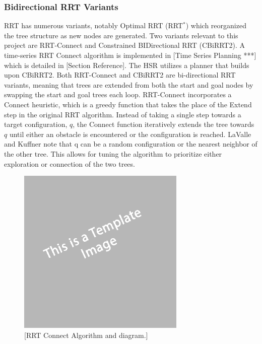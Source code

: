 \documentclass[12pt]{article}
\begin{document}
        \subsubsection{Bidirectional RRT Variants}
            RRT has numerous variants, notably Optimal RRT (RRT\(^*\)) which reorganized the tree structure as new nodes are generated. Two variants relevant to this project are RRT-Connect and Constrained BIDirectional RRT (CBiRRT2). A time-series RRT Connect algorithm is implemented in [Time Series Planning ***] which is detailed in [Section Reference]. The HSR utilizes a planner that builds upon CBiRRT2. Both RRT-Connect and CBiRRT2 are bi-directional RRT variants, meaning that trees are extended from both the start and goal nodes by swapping the start and goal trees each loop. RRT-Connect incorporates a Connect heuristic, which is a greedy function that takes the place of the Extend step in the original RRT algorithm. Instead of taking a single step towards a target configuration, \(q\), the Connect function iteratively extends the tree towards \(q\) until either an obstacle is encountered or the configuration is reached. LaValle and Kuffner note that q can be a random configuration or the nearest neighbor of the other tree. This allows for tuning the algorithm to prioritize either exploration or connection of the two trees.
            \begin{figure}[ht][ht]
                \includegraphics[width=8cm]{temp}
                \centering
                \caption{[RRT Connect Algorithm and diagram.]}
            \end{figure}
\end{document}
